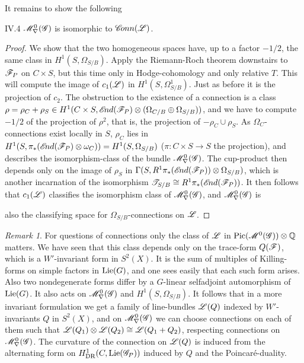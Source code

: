 \documentclass[12pt,english]{smfart}
\theoremstyle{plain} \newtheorem{innerthm}{Theorem} \newtheorem{innerlem}{Lemma} \newtheorem{innerprop}{Proposition} \newtheorem{innercor}{Corollary} \theoremstyle{definition} \newtheorem{innerdefn}{Definition} \newtheorem{innerconstr}{Construction} \theoremstyle{remark} \newtheorem*{remark}{Remark} \newtheorem*{remarks}{Remarks} \newtheorem*{applications}{Applications}
\begin{document}
It remains to show the following

\begin{lemma}{IV.4}\label{lem:IV.4}
$\mathscr{M}^0_\nabla(\mathscr{G})$ is isomorphic to $\mathscr{C}\!onn(\mathscr{L})$.
\end{lemma}

\begin{proof}
We show that the two homogeneous spaces have, up to a factor $-1/2$, the same class in $H^1(S,\Omega_{S/B})$. Apply the Riemann-Roch theorem downstairs to $\mathscr{F}_P$ on $C\times S$, but this time only in Hodge-cohomology and only relative $T$. This will compute the image of $c_1(\mathscr{L})$ in $H^1(S,\Omega^1_{S/B})$. Just as before it is the projection of $c_2$. The obstruction to the existence of a connection is a class $\rho=\rho_C+\rho_S\in H^1(C\times S,\mathscr{E}\!nd(\mathscr{F}_P)\otimes (\Omega_{C/B}\oplus\Omega_{S/B}))$, and we have to compute $-1/2$ of the projection of $\rho^2$, that is, the projection of $-\rho_C\cup\rho_S$. As $\Omega_C$-connections exist locally in $S$, $\rho_C$ lies in $H^1(S,\pi_*(\mathscr{E}\!nd(\mathscr{F}_P)\otimes\omega_C))=H^1(S,\Omega_{S/B})$ ($\pi\colon C\times S\to S$ the projection), and describes the isomorphism-class of the bundle $\mathscr{M}^0_\nabla(\mathscr{G})$. The cup-product then depends only on the image of $\rho_S$ in $\Gamma(S,R^1\pi_*(\mathscr{E}\!nd(\mathscr{F}_P))\otimes\Omega_{S/B})$, which is another incarnation of the isomorphism $\mathscr{T}_{S/B}\cong R^1\pi_*(\mathscr{E}\!nd(\mathscr{F}_P))$. It then follows that $c_1(\mathscr{L})$ classifies the isomorphism class of $\mathscr{M}^0_\nabla(\mathscr{G})$, and $\mathscr{M}^0_\nabla(\mathscr{G})$ is


also the classifying space for $\Omega_{S/B}$-connections on $\mathscr{L}$.
\end{proof}

\begin{remark}
For questions of connections only the class of $\mathscr{L}$ in $\operatorname{Pic}(\mathscr{M}^0(\mathscr{G}))\otimes\mathbb{Q}$ matters. We have seen that this class depends only on the trace-form $Q(\mathscr{F})$, which is a $W'$-invariant form in $S^2(X)$. It is the sum of multiples of Killing-forms on simple factors in $\operatorname{Lie}(G)$, and one sees easily that each such form arises. Also two nondegenerate forms differ by a $G$-linear selfadjoint automorphism of $\operatorname{Lie}(G)$. It also acts on $\mathscr{M}^0_\nabla(\mathscr{G})$ and $H^1(S,\Omega_{S/B})$. It follows that in a more invariant formulation we get a family of line-bundles $\mathscr{L}(Q)$ indexed by $W'$-invariants $Q$ in $S^2(X)$, and on $\mathscr{M}^0_\nabla(\mathscr{G})$ we can choose connections on each of them such that $\mathscr{L}(Q_1)\otimes\mathscr{L}(Q_2)\cong\mathscr{L}(Q_1+Q_2)$, respecting connections on $\mathscr{M}^0_\nabla(\mathscr{G})$. The curvature of the connection on $\mathscr{L}(Q)$ is induced from the alternating form on $H_{\mathrm{DR}}^1(C,\operatorname{Lie}(\mathscr{G}_P))$ induced by $Q$ and the Poincar\'e-duality.
\end{remark}
\end{document}

